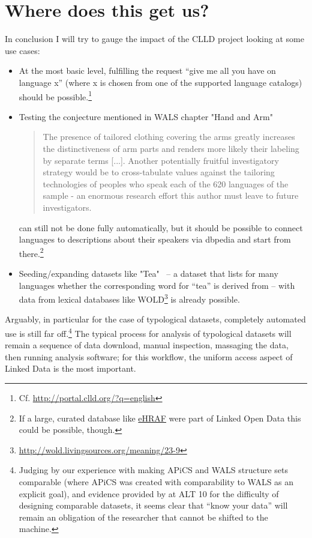 \documentclass[a4paper,10pt]{article}
\begin{document}
\section{Where does this get us?}
In conclusion I will try to gauge the impact of the CLLD project looking at some use cases:
\begin{itemize}
\item At the most basic level,
fulfilling the request ``give me all you have on language x'' (where x is chosen from one of the supported language catalogs) 
should be possible.\footnote{Cf. \url{http://portal.clld.org/?q=english}}
\item Testing the conjecture mentioned in WALS chapter "Hand and Arm" \cite{wals-129}
\begin{quote}
The presence of tailored clothing covering the arms greatly increases the distinctiveness of arm parts and renders more likely their labeling by separate terms [...]. Another potentially fruitful investigatory strategy would be to cross-tabulate values against the tailoring technologies of peoples who speak each of the 620 languages of the sample - an enormous research effort this author must leave to future investigators.
\end{quote}
can still not be done fully automatically, but it should be possible to connect languages to descriptions about their speakers via 
dbpedia and start from there.\footnote{If a large, curated database like \href{http://www.yale.edu/hraf/}{eHRAF} were part of Linked Open Data this could be possible, though.}
\item Seeding/expanding datasets like "Tea"~\cite{wals-138} -- a dataset that lists for many
languages whether the corresponding word for ``tea'' is derived from
 -- with data from lexical databases like WOLD\footnote{\url{http://wold.livingsources.org/meaning/23-9}}
is already possible.
\end{itemize}

Arguably, in particular for the case of typological datasets, completely automated use is still far off.\footnote{Judging by our experience with making
APiCS and WALS structure sets comparable (where APiCS was created with comparability to WALS as an explicit goal),
and evidence provided by  at ALT 10 for the difficulty of designing comparable datasets,
it seems clear that ``know your data'' will remain an obligation of the researcher that cannot be shifted to the machine.}
The typical process for analysis of typological datasets will remain a sequence of 
data download, manual inspection, massaging the data, then running analysis software; for this workflow, the uniform access aspect of Linked Data 
is the most important.
\end{document}
